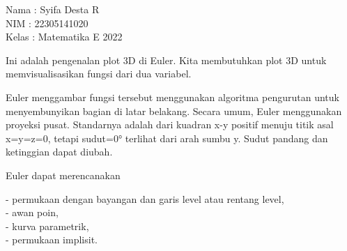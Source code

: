 \documentclass[a4paper,10pt]{article}
\begin{document}
\begin{eulernotebook}
\begin{eulercomment}
Nama  : Syifa Desta R\\
NIM   : 22305141020\\
Kelas : Matematika E 2022

\begin{eulercomment}
\begin{eulercomment}
Ini adalah pengenalan plot 3D di Euler. Kita membutuhkan plot 3D untuk
memvisualisasikan fungsi dari dua variabel.

Euler menggambar fungsi tersebut menggunakan algoritma pengurutan
untuk menyembunyikan bagian di latar belakang. Secara umum, Euler
menggunakan proyeksi pusat. Standarnya adalah dari kuadran x-y positif
menuju titik asal x=y=z=0, tetapi sudut=0° terlihat dari arah sumbu y.
Sudut pandang dan ketinggian dapat diubah.

Euler dapat merencanakan

- permukaan dengan bayangan dan garis level atau rentang level,\\
- awan poin,\\
- kurva parametrik,\\
- permukaan implisit.


\end{eulercomment}
\end{eulercomment}
\end{eulercomment}
\end{eulernotebook}
\end{document}
